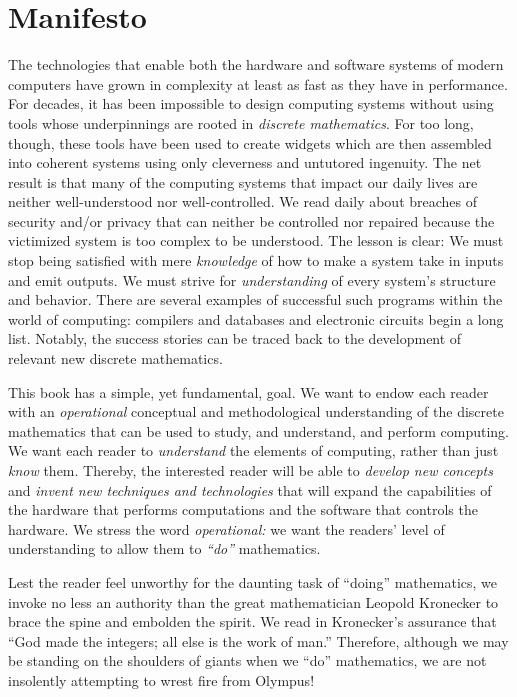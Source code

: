 
\chapter*{Manifesto}

The technologies that enable both the hardware and software systems of
modern computers have grown in complexity at least as fast as they
have in performance.  For decades, it has been impossible to design
computing systems without using tools whose underpinnings are rooted
in {\it discrete mathematics}.  For too long, though, these tools have
been used to create widgets which are then assembled into coherent
systems using only cleverness and untutored ingenuity.  The net result
is that many of the computing systems that impact our daily lives are
neither well-understood nor well-controlled.  We read daily about
breaches of security and/or privacy that can neither be controlled nor
repaired because the victimized system is too complex to be
understood.  The lesson is clear: We must stop being satisfied with
mere {\em knowledge} of how to make a system take in inputs and emit
outputs.  We must strive for {\em understanding} of every system's
structure and behavior.  There are several examples of successful such
programs within the world of computing: compilers and databases and
electronic circuits begin a long list.  Notably, the success stories
can be traced back to the development of relevant new discrete
mathematics.

This book has a simple, yet fundamental, goal.  We want to endow each
reader with an {\em operational} conceptual and methodological
understanding of the discrete mathematics that can be used to study,
and understand, and perform computing.  We want each reader to {\em
  understand} the elements of computing, rather than just {\em know}
them.  Thereby, the interested reader will be able to {\em develop new
  concepts} and {\em invent new techniques and technologies} that will
expand the capabilities of the hardware that performs computations and
the software that controls the hardware.  We stress the word {\it
  operational:} we want the readers' level of understanding to allow
them to {\em ``do''} mathematics.

\bigskip

Lest the reader feel unworthy for the daunting task of ``doing''
mathematics, we invoke no less an authority than the great
mathematician Leopold Kronecker to brace
the spine and embolden the spirit.  We read in \cite{Bell86}
Kronecker's assurance that ``God made the integers; all else is the
work of man.''  Therefore, although we may be standing on the
shoulders of giants when we ``do'' mathematics, we are not insolently
attempting to wrest fire from Olympus!


